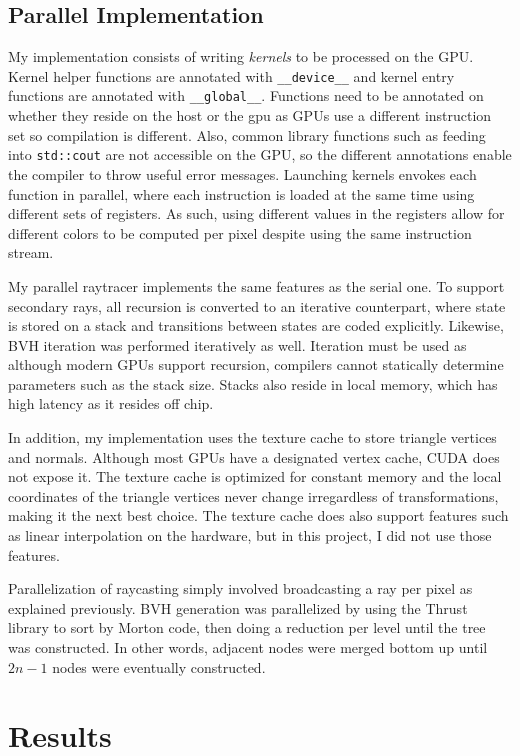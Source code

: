 \documentclass[11pt]{article}
\begin{document}
\subsection{Parallel Implementation}
 My implementation consists of writing \textit{kernels} to be processed on the GPU. Kernel helper functions are annotated with \texttt{\_\_device\_\_} 
 and kernel entry functions are annotated with \texttt{\_\_global\_\_}. Functions need to be annotated on whether they reside on the host or the gpu 
 as GPUs use a different instruction set so compilation is different. Also, common library functions such as feeding into \texttt{std::cout} are not
 accessible on the GPU, so the different annotations enable the compiler to throw useful error messages. Launching kernels envokes each function in 
 parallel, where each instruction is loaded at the same time using different sets of registers. As such, using different values in the registers 
 allow for different colors to be computed per pixel despite using the same instruction stream.

My parallel raytracer implements the same features as the serial one. To support secondary rays, all recursion is
converted to an iterative counterpart, where state is stored on a stack and transitions between states are coded explicitly.
Likewise, BVH iteration was performed iteratively as well. Iteration must be used as although modern GPUs support recursion,
compilers cannot statically determine parameters such as the stack size. Stacks also reside in local memory, which
has high latency as it resides off chip.

In addition, my implementation uses the texture cache to store triangle vertices and normals. Although most GPUs have a designated
vertex cache, CUDA does not expose it. The texture cache is optimized for constant memory and the local coordinates of the triangle 
vertices never change irregardless of transformations, making it the next best choice. The texture cache does also support features
such as linear interpolation on the hardware, but in this project, I did not use those features.

Parallelization of raycasting simply involved broadcasting a ray per pixel as explained previously. BVH generation was parallelized
by using the Thrust library to sort by Morton code, then doing a reduction per level until the tree was constructed. In other words, adjacent nodes
were merged bottom up until $2n-1$ nodes were eventually constructed.

\section{Results}
\end{document}
